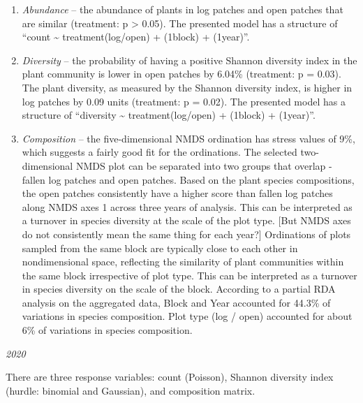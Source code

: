 \documentclass[
]{article}
\providecommand{\tightlist}{%
  \setlength{\itemsep}{0pt}\setlength{\parskip}{0pt}}
\begin{document}
\begin{enumerate}
\def\labelenumi{\arabic{enumi}.}
\tightlist
\item
  \emph{Abundance} -- the abundance of plants in log patches and open
  patches that are similar (treatment: p \textgreater{} 0.05). The
  presented model has a structure of ``count \textasciitilde{}
  treatment(log/open) + (1\textbar block) + (1\textbar year)''.
\item
  \emph{Diversity} -- the probability of having a positive Shannon
  diversity index in the plant community is lower in open patches by
  6.04\% (treatment: p = 0.03). The plant diversity, as measured by the
  Shannon diversity index, is higher in log patches by 0.09 units
  (treatment: p = 0.02). The presented model has a structure of
  ``diversity \textasciitilde{} treatment(log/open) + (1\textbar block)
  + (1\textbar year)''.
\item
  \emph{Composition} -- the five-dimensional NMDS ordination has stress
  values of 9\%, which suggests a fairly good fit for the ordinations.
  The selected two-dimensional NMDS plot can be separated into two
  groups that overlap - fallen log patches and open patches. Based on
  the plant species compositions, the open patches consistently have a
  higher score than fallen log patches along NMDS axes 1 across three
  years of analysis. This can be interpreted as a turnover in species
  diversity at the scale of the plot type. {[}But NMDS axes do not
  consistently mean the same thing for each year?{]} Ordinations of
  plots sampled from the same block are typically close to each other in
  nondimensional space, reflecting the similarity of plant communities
  within the same block irrespective of plot type. This can be
  interpreted as a turnover in species diversity on the scale of the
  block. According to a partial RDA analysis on the aggregated data,
  Block and Year accounted for 44.3\% of variations in species
  composition. Plot type (log / open) accounted for about 6\% of
  variations in species composition.
\end{enumerate}

\emph{2020}

There are three response variables: count (Poisson), Shannon diversity
index (hurdle: binomial and Gaussian), and composition matrix.
\end{document}
